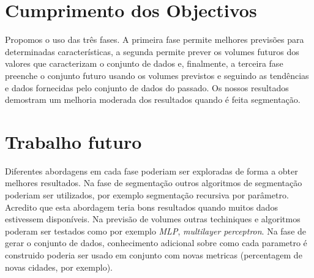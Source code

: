 \documentclass[9pt,a4paper]{extarticle}
\begin{document}
\begin{multicols}{2}
\section{Cumprimento dos Objectivos}

Propomos o uso das três fases. A primeira fase permite melhores previsões para
determinadas características, a segunda permite prever os volumes futuros dos
valores que caracterizam o conjunto de dados e, finalmente, a terceira fase
preenche o conjunto futuro usando os volumes previstos e seguindo as tendências
e dados fornecidas pelo conjunto de dados do passado. Os nossos resultados
demostram um melhoria moderada dos resultados quando é feita segmentação.

\section{Trabalho futuro}

Diferentes abordagens em cada fase poderiam ser exploradas de forma a obter
melhores resultados. Na fase de segmentação outros algoritmos de segmentação
poderiam ser utilizados, por exemplo segmentação recursiva por parâmetro.
Acredito que esta abordagem teria bons resultados quando muitos dados
estivessem disponíveis.
Na previsão de volumes outras techiniques e algoritmos poderam ser testados
como por exemplo \emph{MLP}, \emph{multilayer perceptron}.
Na fase de gerar o conjunto de dados, conhecimento adicional sobre como cada
parametro é construido poderia ser usado em conjunto com novas metricas
(percentagem de novas cidades, por exemplo).



\end{multicols}
\end{document}
